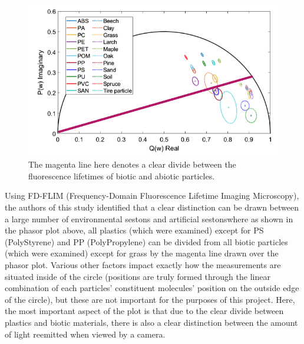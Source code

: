 \documentclass[fleqn,10pt]{SelfArx} %
\begin{document}
	\begin{figure}[h]
		\centering
		\includegraphics[width=1\linewidth]{Figures/PhasorAnnotated.png}
		\caption[Annotated: Phasor Plot \textemdash MPs and Organics]{The magenta line here denotes a clear divide between the fluorescence lifetimes of biotic and abiotic particles.}
		\label{fig:PhasorAnnotated}
	\end{figure}
	
	Using FD-FLIM (Frequency-Domain Fluorescence Lifetime Imaging Microscopy), the authors of this study identified that a clear distinction can be drawn between a large number of environmental \glspl{seston} and artificial sestons\textemdash where as shown in the phasor plot above, all plastics (which were examined) except for PS (PolyStyrene) and PP (PolyPropylene) can be divided from all biotic particles (which were examined) except for grass by the magenta line drawn over the phasor plot. Various other factors impact exactly how the measurements are situated inside of the circle (positions are truly formed through the linear combination of each particles’ constituent molecules’ position on the outside edge of the circle), but these are not important for the purposes of this project. Here, the most important aspect of the plot is that due to the clear divide between plastics and biotic materials, there is also a clear distinction between the amount of light reemitted when viewed by a camera. 
	
\end{document}
